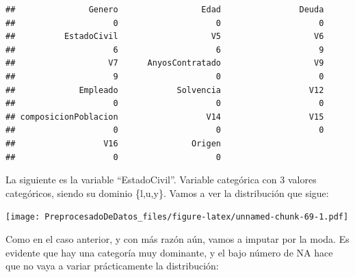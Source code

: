 \documentclass[
]{article}
\newenvironment{Shaded}{\begin{snugshade}}{\end{snugshade}}
\newcommand{\AttributeTok}[1]{\textcolor[rgb]{0.13,0.29,0.53}{#1}}
\newcommand{\FunctionTok}[1]{\textcolor[rgb]{0.13,0.29,0.53}{\textbf{#1}}}
\newcommand{\NormalTok}[1]{#1}
\newcommand{\OtherTok}[1]{\textcolor[rgb]{0.56,0.35,0.01}{#1}}
\newcommand{\SpecialCharTok}[1]{\textcolor[rgb]{0.81,0.36,0.00}{\textbf{#1}}}
\newcommand{\StringTok}[1]{\textcolor[rgb]{0.31,0.60,0.02}{#1}}
\begin{document}
\begin{verbatim}
##               Genero                 Edad                Deuda 
##                    0                    0                    0 
##          EstadoCivil                   V5                   V6 
##                    6                    6                    9 
##                   V7      AnyosContratado                   V9 
##                    9                    0                    0 
##             Empleado            Solvencia                  V12 
##                    0                    0                    0 
## composicionPoblacion                  V14                  V15 
##                    0                    0                    0 
##                  V16               Origen 
##                    0                    0
\end{verbatim}

La siguiente es la variable ``EstadoCivil''. Variable categórica con 3
valores categóricos, siendo su dominio \{l,u,y\}. Vamos a ver la
distribución que sigue:

\begin{Shaded}
\end{Shaded}

\texttt{[image: PreprocesadoDeDatos\_files/figure-latex/unnamed-chunk-69-1.pdf]}

Como en el caso anterior, y con más razón aún, vamos a imputar por la
moda. Es evidente que hay una categoría muy dominante, y el bajo número
de NA hace que no vaya a variar prácticamente la distribución:
\end{document}
